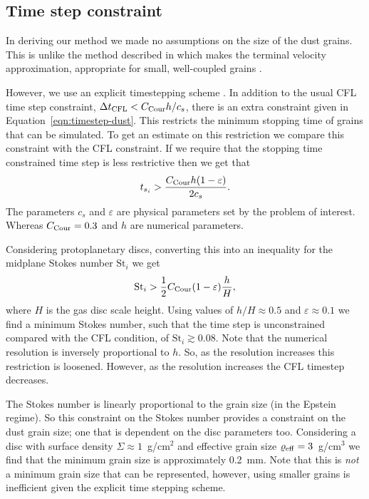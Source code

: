\documentclass[fleqn,usenatbib]{mnras}
\begin{document}
\subsection{Time step constraint}

In deriving our method we made no assumptions on the size of the dust grains.
This is unlike the method described in \citet{Hutchison2018MNRAS.476.2186H}
which makes the terminal velocity approximation, appropriate for small,
well-coupled grains \citep{Youdin2005ApJ...620..459Y}.

However, we use an explicit timestepping scheme
\citep{Price2018PASA...35...31P}. In addition to the usual CFL time step
constraint, \(\Delta t_{\rm CFL} < C_{\rm Cour} h/c_s\), there is an
extra constraint given in Equation~\ref{eqn:timestep-dust}. This restricts the
minimum stopping time of grains that can be simulated. To get an estimate on
this restriction we compare this constraint with the CFL constraint. If we
require that the stopping time constrained time step is less restrictive then we
get that
%
\begin{align}
   t_{s_i} > \frac{C_{\rm Cour} h (1 - \varepsilon)}{2 c_s}.
\end{align}
%
The parameters \(c_s\) and \(\varepsilon\) are physical parameters set by the
problem of interest. Whereas \(C_{\rm Cour} = 0.3\) and \(h\) are numerical
parameters.

Considering protoplanetary discs, converting this into an inequality for the
midplane Stokes number \(\mathrm{St}_i\) we get
%
\begin{align}
   \mathrm{St}_i > \frac{1}{2} C_{\rm Cour} (1 - \varepsilon) \frac{h}{H},
\end{align}
%
where \(H\) is the gas disc scale height. Using values of \(h/H \approx 0.5\)
and \(\varepsilon \approx 0.1\) we find a minimum Stokes number, such that the
time step is unconstrained compared with the CFL condition, of \(\mathrm{St}_i
\gtrsim 0.08\). Note that the numerical resolution is inversely proportional to
\(h\). So, as the resolution increases this restriction is loosened. However, as
the resolution increases the CFL timestep decreases.

The Stokes number is linearly proportional to the grain size (in the Epstein
regime). So this constraint on the Stokes number provides a constraint on the
dust grain size; one that is dependent on the disc parameters too. Considering a
disc with surface density \(\Sigma \approx 1\)~g/cm\({}^2\) and effective grain
size \(\varrho_{\rm eff} = 3\)~g/cm\({}^3\) we find that the minimum grain size
is approximately 0.2~mm. Note that this is \emph{not} a minimum grain size that
can be represented, however, using smaller grains is inefficient given the
explicit time stepping scheme.
\end{document}
